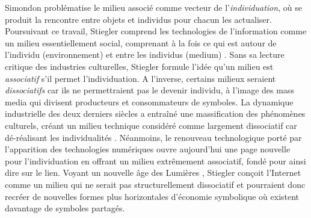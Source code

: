 Simondon problématise le milieu associé comme vecteur de l’\textit{individuation}, où se produit la rencontre entre objets et individus pour chacun les actualiser. Poursuivant ce travail, Stiegler comprend les technologies de l’information comme un milieu essentiellement social, comprenant à la fois ce qui est autour de l’individu (environnement) et entre les individus (medium) \citep{Reference}. Sans sa lecture critique des industries culturelles, Stiegler formule l’idée qu’un milieu est \textit{associatif} s’il permet l’individuation. A l’inverse, certains milieux seraient \textit{dissociatifs} car ils ne permettraient pas le devenir individu, à l’image des mass media qui divisent producteurs et consommateurs de symboles. La dynamique industrielle des deux derniers siècles a entraîné une massification des phénomènes culturels, créant un milieu technique considéré comme largement dissociatif car dé-réalisant les individualités \citep{Simondon1989}. Néanmoins, le renouveau technologique porté par l’apparition des technologies numériques ouvre aujourd’hui une page nouvelle pour l’individuation en offrant un milieu extrêmement associatif, fondé pour ainsi dire sur le lien. Voyant un nouvelle âge des Lumières \citep{Stiegler2012}, Stiegler conçoit l’Internet comme un milieu qui ne serait pas structurellement dissociatif et pourraient donc recréer de nouvelles formes plus horizontales d’économie symbolique où existent davantage de symboles partagés. 

